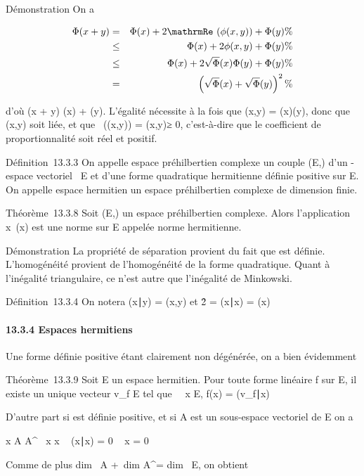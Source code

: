 \documentclass[]{article}
\begin{document}
Démonstration On a

\begin{align*} \Phi(x + y)& =& \Phi(x) +
2\mathrmRe~(\phi(x,y)) +
\Phi(y)\%& \\ & \leq& \Phi(x) +
2\phi(x,y) + \Phi(y) \%& \\
& \leq& \Phi(x) + 2\sqrt\Phi(x)\Phi(y) + \Phi(y)\%&
\\ & =& \left
(\sqrt\Phi(x) +
\sqrt\Phi(y)\right )^2 \%&
\\ \end{align*}

d'où \sqrt\Phi(x + y) \leq\sqrt\Phi(x) +
\sqrt\Phi(y). L'égalité nécessite à la fois que
\phi(x,y) = \sqrt\Phi(x)\Phi(y), donc que
(x,y) soit liée, et que
\mathrmRe~(\phi(x,y)) =
\phi(x,y)≥ 0, c'est-à-dire que le coefficient de
proportionnalité soit réel et positif.

Définition~13.3.3 On appelle espace préhilbertien complexe un couple
(E,\Phi) d'un -espace vectoriel ~E et d'une forme quadratique hermitienne
définie positive sur E. On appelle espace hermitien un espace
préhilbertien complexe de dimension finie.

Théorème~13.3.8 Soit (E,\Phi) un espace préhilbertien complexe. Alors
l'application x\mapsto~\sqrt\Phi(x)
est une norme sur E appelée norme hermitienne.

Démonstration La propriété de séparation provient du fait que \Phi est
définie. L'homogénéité provient de l'homogénéité de la forme
quadratique. Quant à l'inégalité triangulaire, ce n'est autre que
l'inégalité de Minkowski.

Définition~13.3.4 On notera (x∣y) = \phi(x,y) et
\x\^2 =
(x∣x) = \Phi(x)

\paragraph{13.3.4 Espaces hermitiens}

Une forme définie positive étant clairement non dégénérée, on a bien
évidemment

Théorème~13.3.9 Soit E un espace hermitien. Pour toute forme linéaire f
sur E, il existe un unique vecteur v_f \in E tel que
\forall~~x \in E, f(x) =
(v_f∣x)

D'autre part si \Phi est définie positive, et si A est un sous-espace
vectoriel de E on a

x \in A \bigcap A^\bot\rigtharrow~ x \bot x \rigtharrow~ (x∣x) = 0 \rigtharrow~ x
= 0

Comme de plus dim~ A +\
dim A^\bot = dim~ E, on obtient
\end{document}
